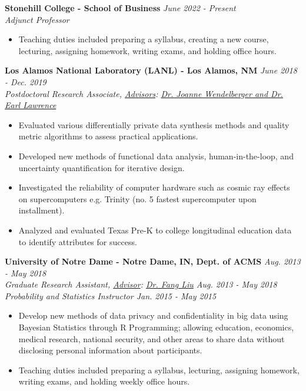\workspace
    \textbf{Stonehill College - School of Business} \hfill \textit{June 2022 - Present}\\
    \textit{Adjunct Professor}
    \begin{itemize}
        \item Teaching duties included preparing a syllabus, creating a new course, lecturing, assigning homework, writing exams, and holding office hours.
    \end{itemize}

\workspace
    \textbf{Los Alamos National Laboratory (LANL) - Los Alamos, NM} \hfill \textit{June 2018 - Dec. 2019}\\
    \textit{Postdoctoral Research Associate, \underline{Advisors}: \href{http://www.lanl.gov/expertise/profiles/view/joanne-wendelberger}{Dr. Joanne Wendelberger and Dr. Earl Lawrence}}
    \begin{itemize}
        \item Evaluated various differentially private data synthesis methods and quality metric algorithms to assess practical applications.
        \item Developed new methods of functional data analysis, human-in-the-loop, and uncertainty quantification for iterative design.
        \item Investigated the reliability of computer hardware such as cosmic ray effects on supercomputers e.g. Trinity (no. 5 fastest supercomputer upon installment).
        \item Analyzed and evaluated Texas Pre-K to college longitudinal education data to identify attributes for success.
    \end{itemize}

\workspace
    \textbf{University of Notre Dame - Notre Dame, IN, Dept. of ACMS} \hfill \textit{Aug. 2013 - May 2018}\\
    \textit{Graduate Research Assistant, \underline{Advisor}: \href{http://acms.nd.edu/people/faculty/fang-liu/}{Dr. Fang Liu} \hfill Aug. 2013 - May 2018}\\
    \textit{Probability and Statistics Instructor \hfill Jan. 2015 - May 2015}
    \begin{itemize}
        \item Develop new methods of data privacy and confidentiality in big data using Bayesian Statistics through R Programming; allowing education, economics, medical research, national security, and other areas to share data without disclosing personal information about participants.
        \item Teaching duties included preparing a syllabus, lecturing, assigning homework, writing exams, and holding weekly office hours.
    \end{itemize}

